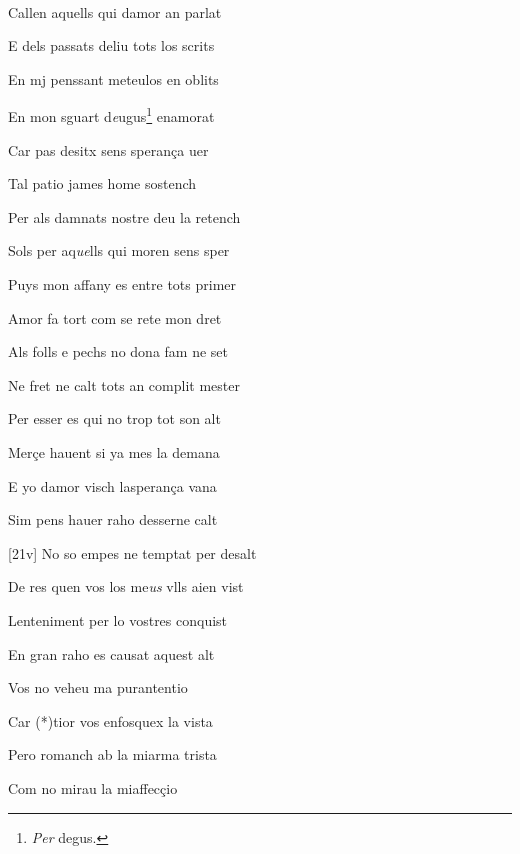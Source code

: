 \documentclass[12pt]{article}
\renewcommand{\espaiAbansEtiquetaPoema}{\vspace{0ex}}
\begin{document}
\begin{estrofa}

\espaiAbansEtiquetaPoema

\\

\end{estrofa}


\begin{estrofa}

 Callen aquells qui damor an parlat

 E dels passats deliu tots los scrits

 En mj penssant meteulos en oblits

 En mon sguart d\textit{e}ugus\footnote{\textit{Per} degus.} enamorat

 Car pas desitx sens speran\c{c}a uer

 Tal patio james home sostench

 Per als damnats nostre deu la retench

 Sols per aq\textit{ue}lls qui moren sens sper

\end{estrofa}



\begin{estrofa}

 Puys mon affany es entre tots primer

 Amor fa tort com se rete mon dret

 Als folls e pechs no dona fam ne set

 Ne fret ne calt tots an complit mester

 Per esser es qui no trop tot son alt

 Mer\c{c}e hauent si ya mes la demana

 E yo damor visch lasperan\c{c}a vana

 Sim pens hauer raho desserne calt

\end{estrofa}



\begin{estrofa}

 [21v] No so empes ne temptat per desalt

 De res quen vos los me\textit{us} vlls aien vist

 Lenteniment per lo vostres conquist

 En gran raho es causat aquest alt

 Vos no veheu ma purantentio

 Car (*)tior vos enfosquex la vista

 Pero romanch ab la miarma trista

 Com no mirau la miaffec\c{c}io

\end{estrofa}
\end{document}
